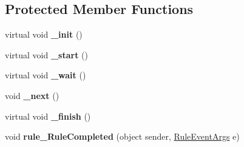 \subsection*{Protected Member Functions}
\begin{DoxyCompactItemize}
\item 
\hypertarget{classlib_watcher_dialog_1_1_combine_rules_1_1_combine_rules_a26bffe5b4d084a188ec89b06b405d5bd}{virtual void {\bfseries \+\_\+init} ()}\label{classlib_watcher_dialog_1_1_combine_rules_1_1_combine_rules_a26bffe5b4d084a188ec89b06b405d5bd}

\item 
\hypertarget{classlib_watcher_dialog_1_1_combine_rules_1_1_combine_rules_a2a2d1f44eb6eb0c3cbb5857ea4620f6b}{virtual void {\bfseries \+\_\+start} ()}\label{classlib_watcher_dialog_1_1_combine_rules_1_1_combine_rules_a2a2d1f44eb6eb0c3cbb5857ea4620f6b}

\item 
\hypertarget{classlib_watcher_dialog_1_1_combine_rules_1_1_combine_rules_a79afe522e44327965811c926bc125c9a}{virtual void {\bfseries \+\_\+wait} ()}\label{classlib_watcher_dialog_1_1_combine_rules_1_1_combine_rules_a79afe522e44327965811c926bc125c9a}

\item 
\hypertarget{classlib_watcher_dialog_1_1_combine_rules_1_1_combine_rules_a109c575b5adf4e0127a6094aac43c2fb}{void {\bfseries \+\_\+next} ()}\label{classlib_watcher_dialog_1_1_combine_rules_1_1_combine_rules_a109c575b5adf4e0127a6094aac43c2fb}

\item 
\hypertarget{classlib_watcher_dialog_1_1_combine_rules_1_1_combine_rules_abed52b9b9ecfc7f96560dce14464c063}{virtual void {\bfseries \+\_\+finish} ()}\label{classlib_watcher_dialog_1_1_combine_rules_1_1_combine_rules_abed52b9b9ecfc7f96560dce14464c063}

\item 
\hypertarget{classlib_watcher_dialog_1_1_combine_rules_1_1_combine_rules_a382dfa921af11fa78253580d25b7b464}{void {\bfseries rule\+\_\+\+Rule\+Completed} (object sender, \hyperlink{class_watcher_1_1_debugger_1_1_event_args_1_1_rule_event_args}{Rule\+Event\+Args} e)}\label{classlib_watcher_dialog_1_1_combine_rules_1_1_combine_rules_a382dfa921af11fa78253580d25b7b464}

\end{DoxyCompactItemize}
